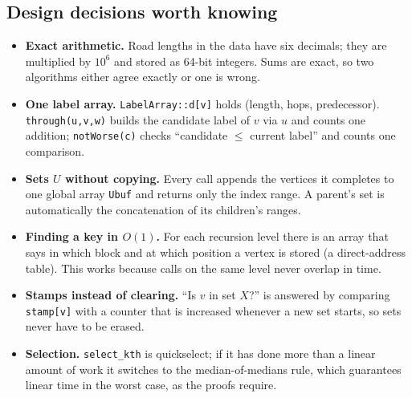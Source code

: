 \documentclass[11pt,a4paper]{article}
\newcommand{\code}[1]{\texttt{#1}}
\begin{document}
\subsection{Design decisions worth knowing}
\begin{itemize}
\item \textbf{Exact arithmetic.} Road lengths in the data have six decimals; they are multiplied by $10^6$ and stored as 64-bit integers. Sums are exact, so two algorithms either agree exactly or one is wrong.
\item \textbf{One label array.} \code{LabelArray::d[v]} holds (length, hops, predecessor). \code{through(u,v,w)} builds the candidate label of $v$ via $u$ and counts one addition; \code{notWorse(c)} checks ``candidate $\le$ current label'' and counts one comparison.
\item \textbf{Sets $U$ without copying.} Every call appends the vertices it completes to one global array \code{Ubuf} and returns only the index range. A parent's set is automatically the concatenation of its children's ranges.
\item \textbf{Finding a key in $O(1)$.} For each recursion level there is an array that says in which block and at which position a vertex is stored (a direct-address table). This works because calls on the same level never overlap in time.
\item \textbf{Stamps instead of clearing.} ``Is $v$ in set $X$?'' is answered by comparing \code{stamp[v]} with a counter that is increased whenever a new set starts, so sets never have to be erased.
\item \textbf{Selection.} \code{select\_kth} is quickselect; if it has done more than a linear amount of work it switches to the median-of-medians rule, which guarantees linear time in the worst case, as the proofs require.
\end{itemize}
\end{document}
